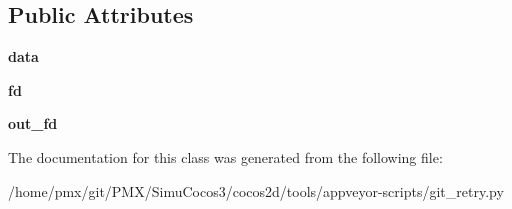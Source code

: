\subsection*{Public Attributes}
\begin{DoxyCompactItemize}
\item 
\mbox{\label{classgit__retry_1_1TeeThread_a057e353f8b40e35bd3a59a8b02a1f99a}} 
{\bfseries data}
\item 
\mbox{\label{classgit__retry_1_1TeeThread_a3fb872c52b01e7c4cc9a5fd7689025b2}} 
{\bfseries fd}
\item 
\mbox{\label{classgit__retry_1_1TeeThread_a0a331c4384a0f56a339a934e08b54b81}} 
{\bfseries out\+\_\+fd}
\end{DoxyCompactItemize}


The documentation for this class was generated from the following file\+:\begin{DoxyCompactItemize}
\item 
/home/pmx/git/\+P\+M\+X/\+Simu\+Cocos3/cocos2d/tools/appveyor-\/scripts/git\+\_\+retry.\+py\end{DoxyCompactItemize}

